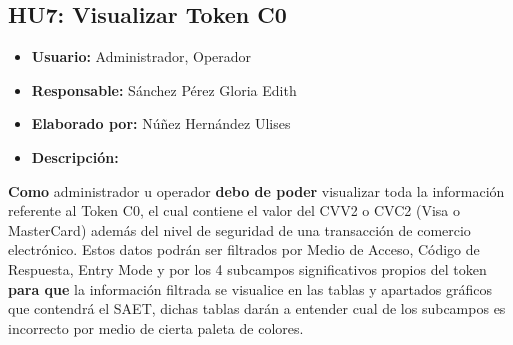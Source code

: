 \subsection{HU7: Visualizar Token C0}
\begin{itemize}
	\item \textbf{Usuario:} Administrador, Operador
	\item \textbf{Responsable:} Sánchez Pérez Gloria Edith
	\item \textbf{Elaborado por:} Núñez Hernández Ulises
	\item \textbf{Descripción:}
\end{itemize}
\textbf{Como} administrador u operador \textbf{debo de poder} visualizar toda la información referente al Token C0, el cual contiene el valor del CVV2 o CVC2 (Visa o MasterCard) además del nivel de seguridad de una transacción de comercio electrónico. Estos datos podrán ser filtrados por Medio de Acceso, Código de Respuesta, Entry Mode y por los 4 subcampos significativos propios del token \textbf{para que} la información filtrada se visualice en las tablas y apartados gráficos que contendrá el SAET, dichas tablas darán a entender cual de los subcampos es incorrecto por medio de cierta paleta de colores. 